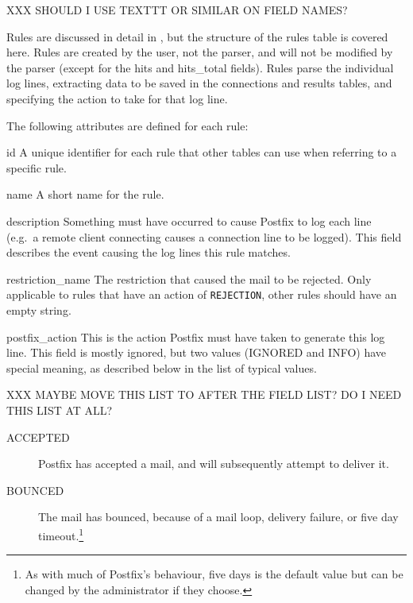 \label{rule attributes}

XXX SHOULD I USE TEXTTT OR SIMILAR ON FIELD NAMES\@?

Rules are discussed in detail in , but the structure of
the rules table is covered here.  Rules are created by the user, not the
parser, and will not be modified by the parser (except for the hits and
hits\_total fields).  Rules parse the individual log lines, extracting data
to be saved in the connections and results tables, and specifying the
action to take for that log line.

The following attributes are defined for each rule:

\begin{eqlist}

    \item [id] A unique identifier for each rule that other tables can use
        when referring to a specific rule.

    \item [name] A short name for the rule.

    \item [description] Something must have occurred to cause Postfix to
        log each line (e.g.\ a remote client connecting causes a connection
        line to be logged).  This field describes the event causing the log
        lines this rule matches.

    \item [restriction\_name] The restriction that caused the mail to be
        rejected.  Only applicable to rules that have an action of
        \texttt{REJECTION}, other rules should have an empty string.

    \item [postfix\_action] This is the action Postfix must have taken to
        generate this log line.  This field is mostly ignored, but two
        values (IGNORED and INFO) have special meaning, as described below
        in the list of typical values.\label{postfix_action}

        XXX MAYBE MOVE THIS LIST TO AFTER THE FIELD LIST\@?  DO I NEED THIS
        LIST AT ALL\@?

        \begin{description}

            \item [ACCEPTED] Postfix has accepted a mail, and will
                subsequently attempt to deliver it.

            \item [BOUNCED] The mail has bounced, because of a mail loop,
                delivery failure, or five day timeout.\footnote{As with
                much of Postfix's behaviour, five days is the default value
                but can be changed by the administrator if they choose.}


\end{description}
\end{eqlist}
